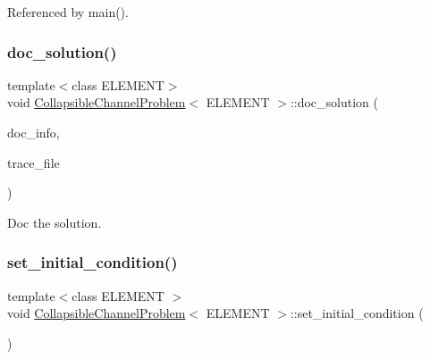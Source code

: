 Referenced by main().

\mbox{\label{classCollapsibleChannelProblem_afc4af9796c01d904d4074bd5bbfc5b9b}} 
\subsubsection{\texorpdfstring{doc\+\_\+solution()}{doc\_solution()}\hspace{0.1cm}{\footnotesize\ttfamily [2/2]}}
{\footnotesize\ttfamily template$<$class E\+L\+E\+M\+E\+NT$>$ \\
void \hyperlink{classCollapsibleChannelProblem}{Collapsible\+Channel\+Problem}$<$ E\+L\+E\+M\+E\+NT $>$\+::doc\+\_\+solution (\begin{DoxyParamCaption}\item[{Doc\+Info \&}]{doc\+\_\+info,  }\item[{ofstream \&}]{trace\+\_\+file }\end{DoxyParamCaption})}



Doc the solution. 

\mbox{\label{classCollapsibleChannelProblem_a646147fb75669cfcc5bb56ee79d9b8da}} 
\subsubsection{\texorpdfstring{set\+\_\+initial\+\_\+condition()}{set\_initial\_condition()}\hspace{0.1cm}{\footnotesize\ttfamily [1/2]}}
{\footnotesize\ttfamily template$<$class E\+L\+E\+M\+E\+NT $>$ \\
void \hyperlink{classCollapsibleChannelProblem}{Collapsible\+Channel\+Problem}$<$ E\+L\+E\+M\+E\+NT $>$\+::set\+\_\+initial\+\_\+condition (\begin{DoxyParamCaption}{ }\end{DoxyParamCaption})}




